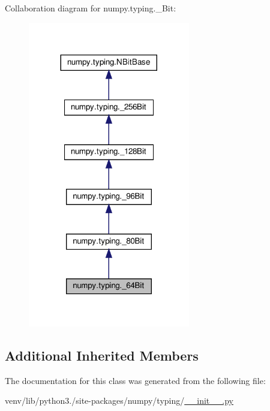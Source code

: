 Collaboration diagram for numpy.\+typing.\+\_\+Bit\+:
\nopagebreak
\begin{figure}[H]
\begin{center}
\leavevmode
\includegraphics[width=200pt]{classnumpy_1_1typing_1_1__64Bit__coll__graph}
\end{center}
\end{figure}
\subsection*{Additional Inherited Members}


The documentation for this class was generated from the following file\+:\begin{DoxyCompactItemize}
\item 
venv/lib/python3./site-\/packages/numpy/typing/\hyperlink{venv_2lib_2python3_89_2site-packages_2numpy_2typing_2____init_____8py}{\+\_\+\+\_\+init\+\_\+\+\_\+.\+py}\end{DoxyCompactItemize}
